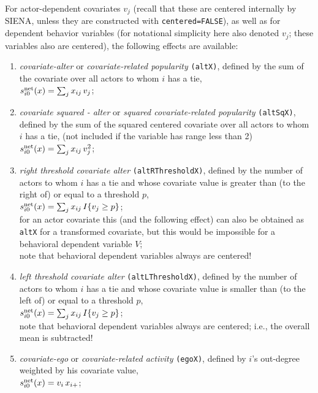 \documentclass[a4paper,fleqn,11pt]{article}
\newcommand{\+}{\, + \,}
\newcommand{\si}{{\sf SIENA}}
\newcommand{\vit}{\theenumi}
\newcounter{savenumi}
\begin{document}
\noindent
For actor-dependent covariates $v_j$ (recall that these are
centered internally by \si, unless they are constructed with
\texttt{centered=FALSE}), as well as for dependent behavior
variables (for notational simplicity here also denoted $v_j$;
these variables also are centered),
the following effects are available:
\begin{enumerate}
\setcounter{enumi}{\value{savenumi}}

 \item {\em covariate-alter} or {\em covariate-related popularity}
 \texttt{(altX)},
 defined by the sum of the covariate over all actors to whom $i$ has a tie,\\
 $s^{\rm net}_{i\vit}(x) = \sum_j x_{ij}\, v_j$;

 \item {\em covariate squared - alter} or {\em squared covariate-related popularity} \texttt{(altSqX)},
 defined by the sum of the squared centered covariate over all actors to whom $i$ has a tie,
 (not included if the variable has range less than 2)\\
 $s^{\rm net}_{i\vit}(x) = \sum_j x_{ij}\, v_j^2$;

 \item {\em right threshold covariate alter}
 \texttt{(altRThresholdX)},
 defined by the number of actors to whom $i$ has a tie
 and whose covariate value
 is greater than (to the right of)  or equal to a threshold $p$,\\
 $s^{\rm net}_{i\vit}(x) = \sum_j x_{ij}\, I\{v_j \geq p\} $;\\
 for an actor covariate this (and the following effect)
 can also be obtained as \texttt{altX} for a transformed
 covariate, but this would be impossible for a behavioral dependent variable $V$;\\
 note that behavioral dependent variables always are centered!

 \item {\em left threshold covariate alter}
 \texttt{(altLThresholdX)},
 defined by the number of actors to whom $i$ has a tie
 and whose covariate value
 is smaller than (to the left of)  or equal to a threshold $p$,\\
 $s^{\rm net}_{i\vit}(x) = \sum_j x_{ij}\, I\{v_j \geq p\} $;\\
 note that behavioral dependent variables always are centered;
 i.e., the overall mean is subtracted!

 \item {\em covariate-ego} or {\em covariate-related activity}
 \texttt{(egoX)},
 defined by $i$'s out-degree weighted by his covariate value,\\
 $s^{\rm net}_{i\vit}(x) = v_i \, x_{i+} $;


\end{enumerate}
\end{document}

